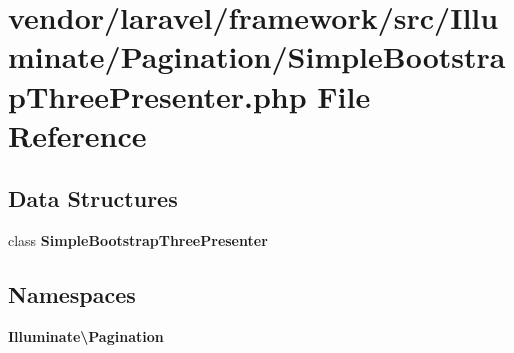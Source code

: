 \section{vendor/laravel/framework/src/\+Illuminate/\+Pagination/\+Simple\+Bootstrap\+Three\+Presenter.php File Reference}
\label{_simple_bootstrap_three_presenter_8php}
\subsection*{Data Structures}
\begin{DoxyCompactItemize}
\item 
class {\bf Simple\+Bootstrap\+Three\+Presenter}
\end{DoxyCompactItemize}
\subsection*{Namespaces}
\begin{DoxyCompactItemize}
\item 
 {\bf Illuminate\textbackslash{}\+Pagination}
\end{DoxyCompactItemize}
